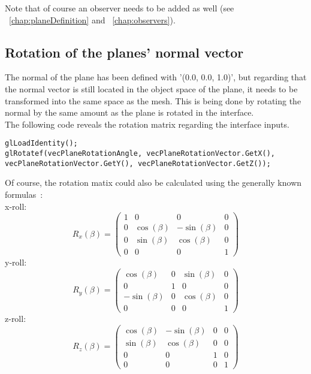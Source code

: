 Note that of course an observer needs to be added as well (see ~\ref{chap:planeDefinition} and ~\ref{chap:observers}).

\subsection{Rotation of the planes' normal vector}
The normal of the plane has been defined with '(0.0, 0.0, 1.0)', but regarding that the normal vector is still located in the object space of the plane, it needs to be transformed into the same space as the mesh. This is being done by rotating the normal by the same amount as the plane is rotated in the interface.\\
The following code reveals the rotation matrix regarding the interface inputs.
\begin{lstlisting}
glLoadIdentity();
glRotatef(vecPlaneRotationAngle, vecPlaneRotationVector.GetX(), vecPlaneRotationVector.GetY(), vecPlaneRotationVector.GetZ());
\end{lstlisting}
Of course, the rotation matix could also be calculated using the generally known formulas~\cite{book:computerGraphicsHill}:\\ %
\newline
x-roll:
\begin{equation}
R_{x}(\beta) = 
\begin{pmatrix} 
	1 & 0 & 0 & 0 \\ 
	0 & \cos(\beta) & -\sin(\beta) & 0 \\ 
	0 & \sin(\beta) & \cos(\beta) & 0 \\ 
	0 & 0 & 0 & 1 
\end{pmatrix}
\end{equation}
\newline
y-roll:\\
\begin{equation}
R_{y}(\beta) =
\begin{pmatrix} 
	\cos(\beta) & 0 & \sin(\beta) & 0 \\
	0 & 1 & 0 & 0 \\
	-\sin(\beta) & 0 & \cos(\beta) & 0 \\
	0 & 0 & 0 & 1
\end{pmatrix}
\end{equation}
\newline
z-roll:\\
\begin{equation}
R_{z}(\beta) =
\begin{pmatrix} 
	\cos(\beta) & -\sin(\beta) & 0 & 0 \\
	\sin(\beta) & \cos(\beta) & 0 & 0 \\
	0 & 0 & 1 & 0 \\
	0 & 0 & 0 & 1
\end{pmatrix}
\end{equation}
